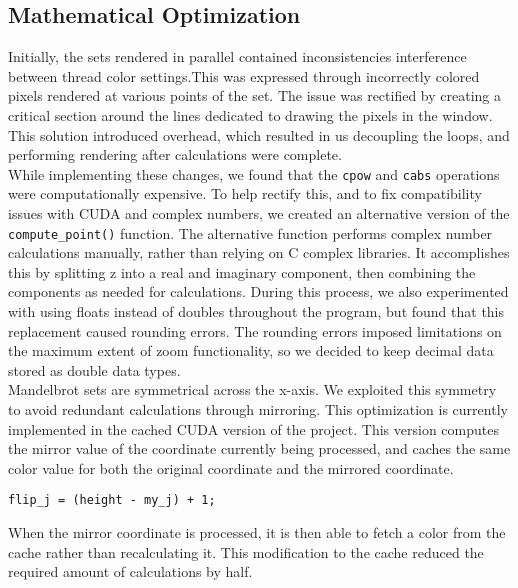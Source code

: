 \documentclass{article}
\begin{document}
\pagebreak

\subsection{Mathematical Optimization}

Initially, the sets rendered in parallel contained inconsistencies interference between thread color settings.This was expressed through incorrectly colored pixels rendered at various points of the set.
The issue was rectified by creating a critical section around the lines dedicated to drawing the pixels in the window.
This solution introduced overhead, which resulted in us decoupling the loops, and performing rendering after calculations were complete.\\

While implementing these changes, we found that the \verb|cpow| and \verb|cabs| operations were computationally expensive.
To help rectify this, and to fix compatibility issues with CUDA and complex numbers, we created an alternative version of the \verb|compute_point()| function.
The alternative function performs complex number calculations manually, rather than relying on C complex libraries.
It accomplishes this by splitting z into a real and imaginary component, then combining the components as needed for calculations.
During this process, we also experimented with using floats instead of doubles throughout the program, but found that this replacement caused rounding errors.
The rounding errors imposed limitations on the maximum extent of zoom functionality, so we decided to keep decimal data stored as double data types.\\

Mandelbrot sets are symmetrical across the x-axis.
We exploited this symmetry to avoid redundant calculations through mirroring.
This optimization is currently implemented in the cached CUDA version of the project.
This version computes the mirror value of the coordinate currently being processed, and caches the same color value for both the original coordinate and the mirrored coordinate.

\begin{verbatim}
flip_j = (height - my_j) + 1;
\end{verbatim}

When the mirror coordinate is processed, it is then able to fetch a color from the cache rather than recalculating it.
This modification to the cache reduced the required amount of calculations by half.
\end{document}
